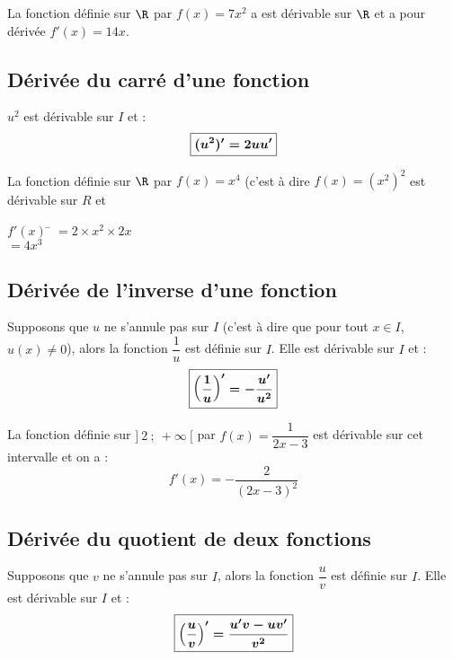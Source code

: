 \documentclass[a4paper,11pt,cours]{nsi} %
\begin{document}
\begin{exemple}[]
	La fonction définie sur $\R$ par $f(x)=7x^2$ a est dérivable sur $\R$ et a pour dérivée $f'(x)=14x$.	
\end{exemple}

\subsection{Dérivée du carré d'une fonction}
\begin{propriete}
	$u^2$ est dérivable sur $I$ et :$${\boldmath\boxed{(u^2)'=2uu'}}$$
\end{propriete}
\begin{demonstration}
\end{demonstration}
\begin{exemple}[]
	La fonction définie sur $\R$ par $f(x)=x^4$ (c'est à dire $f(x)=\left(x^2\right)^2$ est dérivable sur $R$ et
	\begin{tabbing}
		$f'(x)$	\=	$=2\times x^2\times 2x$\\
		\>	$=4x^3$
	\end{tabbing}	
\end{exemple}

\subsection{Dérivée de l'inverse d'une fonction}

\begin{propriete}[]
	Supposons que $u$ ne s'annule pas sur $I$ (c'est à dire que pour tout $x\in I$, $u(x)\neq 0$), alors la fonction $\dfrac{1}{u}$  est définie sur $I$. Elle est dérivable sur $I$ et :
	$${\boldmath\boxed{\left(\dfrac{1}{u}\right)'=-\dfrac{u'}{u^2}}}$$
\end{propriete}
\begin{demonstration}
\end{demonstration}
\begin{exemple}[]
	La fonction définie sur $]\ 2\ ;\ +\infty\ [$ par $f(x)=\dfrac{1}{2x-3}$ est dérivable sur cet intervalle et on a :
	$$f'(x)=-\dfrac{2}{(2x-3)^2}$$	
\end{exemple}

\subsection{Dérivée du quotient de deux fonctions}
\begin{propriete}
	Supposons que $v$ ne s'annule pas sur $I$, alors la fonction $\dfrac{u}{v}$ est définie sur $I$. Elle est dérivable sur $I$ et 
	:$${\boldmath\boxed{\left(\dfrac{u}{v}\right)'=\dfrac{u'v-uv'}{v^2}}}$$
\end{propriete}
\begin{demonstration}
	\\

\end{demonstration}
\end{document}
